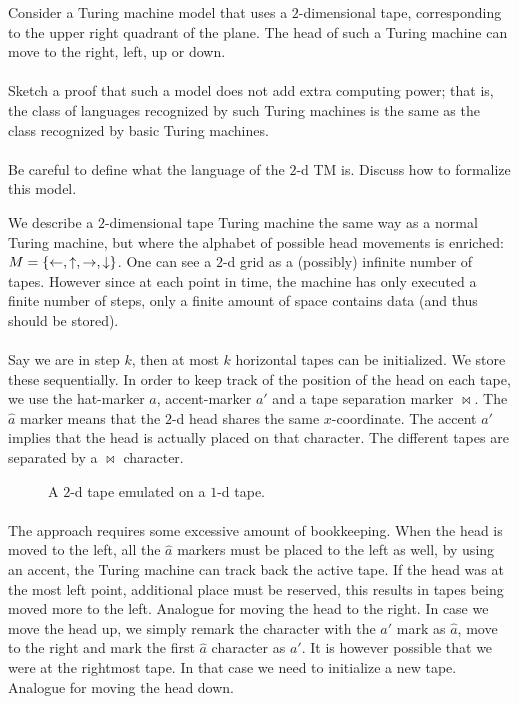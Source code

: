 \documentclass{article}
\begin{document}
\begin{exercise}
Consider a Turing machine model that uses a $2$-dimensional tape, corresponding to the upper right quadrant of the plane. The head of such a Turing machine can move to the right, left, up or down.
\paragraph{}
Sketch a proof that such a model does not add extra computing power; that is, the class of languages recognized by such Turing machines is the same as the class recognized by basic Turing machines.
\paragraph{}
Be careful to define what the language of the $2$-d TM is. Discuss how to formalize this model.
\begin{answer}
We describe a $2$-dimensional tape Turing machine the same way as a normal Turing machine, but where the alphabet of possible head movements is enriched: $M=\left\{ \leftarrow,\uparrow,\rightarrow,\downarrow \right\}$.
One can see a $2$-d grid as a (possibly) infinite number of tapes. However since at each point in time, the machine has only executed a finite number of steps, only a finite amount of space contains data (and thus should be stored).
\paragraph{}
Say we are in step $k$, then at most $k$ horizontal tapes can be initialized. We store these sequentially. In order to keep track of the position of the head on each tape, we use the hat-marker $\hat{a}$, accent-marker $a'$ and a tape separation marker $\bowtie$. The $\hat{a}$ marker means that the $2$-d head shares the same $x$-coordinate. The accent $a'$ implies that the head is actually placed on that character. The different tapes are separated by a $\bowtie$ character.
\begin{figure}[hbt]
\centering
{}
\caption{A $2$-d tape emulated on a $1$-d tape.}
\end{figure}
\paragraph{}
The approach requires some excessive amount of bookkeeping. When the head is moved to the left, all the $\hat{a}$ markers must be placed to the left as well, by using an accent, the Turing machine can track back the active tape. If the head was at the most left point, additional place must be reserved, this results in tapes being moved more to the left. Analogue for moving the head to the right. In case we move the head up, we simply remark the character with the $a'$ mark as $\hat{a}$, move to the right and mark the first $\hat{a}$ character as $a'$. It is however possible that we were at the rightmost tape. In that case we need to initialize a new tape. Analogue for moving the head down.
\end{answer}
\end{exercise}
\end{document}
